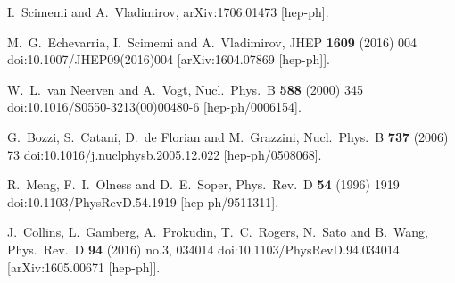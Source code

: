 \documentclass[10pt,a4paper]{article}
\begin{document}
\newpage

\begin{thebibliography}{alp}

  I.~Scimemi and A.~Vladimirov,
  arXiv:1706.01473 [hep-ph].

  M.~G.~Echevarria, I.~Scimemi and A.~Vladimirov,
  JHEP {\bf 1609} (2016) 004
  doi:10.1007/JHEP09(2016)004
  [arXiv:1604.07869 [hep-ph]].

  W.~L.~van Neerven and A.~Vogt,
  Nucl.\ Phys.\ B {\bf 588} (2000) 345
  doi:10.1016/S0550-3213(00)00480-6
  [hep-ph/0006154].

  G.~Bozzi, S.~Catani, D.~de Florian and M.~Grazzini,
  Nucl.\ Phys.\ B {\bf 737} (2006) 73
  doi:10.1016/j.nuclphysb.2005.12.022
  [hep-ph/0508068].

  R.~Meng, F.~I.~Olness and D.~E.~Soper,
  Phys.\ Rev.\ D {\bf 54} (1996) 1919
  doi:10.1103/PhysRevD.54.1919
  [hep-ph/9511311].

  J.~Collins, L.~Gamberg, A.~Prokudin, T.~C.~Rogers, N.~Sato and B.~Wang,
  Phys.\ Rev.\ D {\bf 94} (2016) no.3,  034014
  doi:10.1103/PhysRevD.94.034014
  [arXiv:1605.00671 [hep-ph]].


\end{thebibliography}
\end{document}
